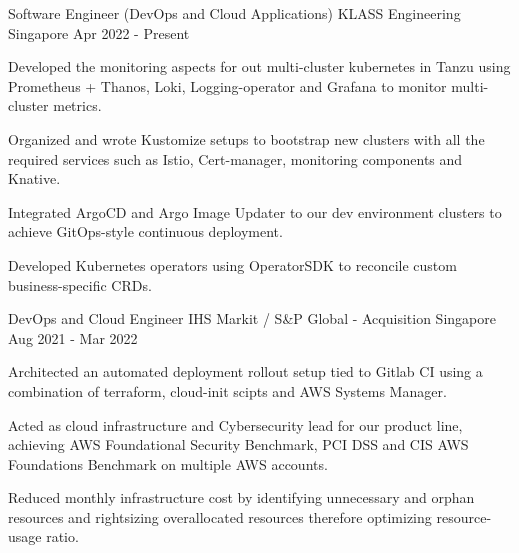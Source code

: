 

\begin{cventries}

  \cventry
    {Software Engineer (DevOps and Cloud Applications)} %
    {KLASS Engineering} %
    {Singapore} %
    {Apr 2022 - Present} %
    {
      \begin{cvitems} %
        \item {Developed the monitoring aspects for out multi-cluster kubernetes in Tanzu using Prometheus + Thanos, Loki, Logging-operator and Grafana to monitor multi-cluster metrics.}
        \item {Organized and wrote Kustomize setups to bootstrap new clusters with all the required services such as Istio, Cert-manager, monitoring components and Knative.}
        \item {Integrated ArgoCD and Argo Image Updater to our dev environment clusters to achieve GitOps-style continuous deployment.}
        \item {Developed Kubernetes operators using OperatorSDK to reconcile custom business-specific CRDs.}
      \end{cvitems}
    }

  \cventry
    {DevOps and Cloud Engineer} %
    {IHS Markit / S\&P Global - Acquisition} %
    {Singapore} %
    {Aug 2021 - Mar 2022} %
    {
      \begin{cvitems} %
        \item {Architected an automated deployment rollout setup tied to Gitlab CI using a combination of terraform, cloud-init scipts and AWS Systems Manager.}
        \item {Acted as cloud infrastructure and Cybersecurity lead for our product line, achieving AWS Foundational Security Benchmark, PCI DSS and CIS AWS Foundations Benchmark on multiple AWS accounts.}
        \item {Reduced monthly infrastructure cost by identifying unnecessary and orphan resources and rightsizing overallocated resources therefore optimizing resource-usage ratio.}
      \end{cvitems}
    }


\end{cventries}
